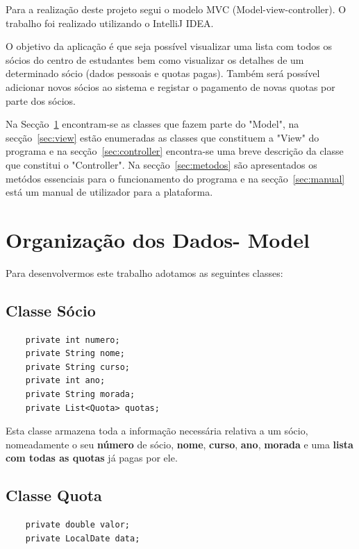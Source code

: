 \documentclass[a4paper]{article}
\begin{document}
Para a realização deste projeto segui o modelo MVC (Model-view-controller). O trabalho foi realizado utilizando o IntelliJ IDEA.


O objetivo da aplicação é que seja possível visualizar uma lista com todos os sócios do centro de estudantes bem como visualizar os detalhes de um determinado sócio (dados pessoais e quotas pagas). Também será possível adicionar novos sócios ao sistema e registar o pagamento de novas quotas por parte dos sócios.

Na Secção~\ref{sec:estruturadedados} encontram-se as classes que fazem parte do "Model", na secção~\ref{sec:view} estão enumeradas as classes que constituem a "View" do programa e na secção~\ref{sec:controller} encontra-se uma breve descrição da classe que constitui o "Controller". Na secção~\ref{sec:metodos} são apresentados os metódos essenciais para o funcionamento do programa e na secção~\ref{sec:manual} está um manual de utilizador para a plataforma.

\section{Organização dos Dados- Model}
\label{sec:estruturadedados}

Para desenvolvermos este trabalho adotamos as seguintes classes:

\subsection{Classe Sócio}
\label{sec:classesocio}

\begin{verbatim}
    private int numero;
    private String nome;
    private String curso;
    private int ano;
    private String morada;
    private List<Quota> quotas;
\end{verbatim}

\vspace{0.2cm}

Esta classe armazena toda a informação necessária relativa a um sócio, nomeadamente o seu \textbf{número} de sócio, \textbf{nome}, \textbf{curso}, \textbf{ano}, \textbf{morada} e uma \textbf{lista com todas as quotas} já pagas por ele.

\subsection{Classe Quota}
\label{sec:classequota}

\begin{verbatim}
    private double valor;
    private LocalDate data;
\end{verbatim}
\end{document}
